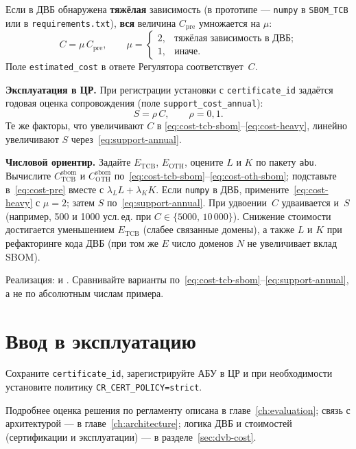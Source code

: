 Если в ДВБ обнаружена \textbf{тяжёлая} зависимость (в прототипе --- \texttt{numpy} в \texttt{SBOM\_TCB} или в \texttt{requirements.txt}), \textbf{вся} величина $C_{\mathrm{pre}}$ умножается на $\mu$:
\begin{equation}
\label{eq:cost-heavy}
  C = \mu\, C_{\mathrm{pre}}, \qquad
  \mu =
  \begin{cases}
    2, & \text{тяжёлая зависимость в ДВБ;} \\
    1, & \text{иначе.}
  \end{cases}
\end{equation}
Поле \texttt{estimated\_cost} в ответе Регулятора соответствует~$C$.

\textbf{Эксплуатация в ЦР.} При регистрации установки с \texttt{certificate\_id} задаётся годовая оценка сопровождения (поле \texttt{support\_cost\_annual}):
\begin{equation}
\label{eq:support-annual}
  S = \rho\, C, \qquad \rho = 0{,}1.
\end{equation}
Те же факторы, что увеличивают $C$ в \eqref{eq:cost-tcb-sbom}--\eqref{eq:cost-heavy}, линейно увеличивают $S$ через~\eqref{eq:support-annual}.

\textbf{Числовой ориентир.} Задайте $E_{\mathrm{TCB}}$, $E_{\mathrm{OTH}}$, оцените $L$ и $K$ по пакету \texttt{abu}. Вычислите $C_{\mathrm{TCB}}^{\mathrm{sbom}}$ и $C_{\mathrm{OTH}}^{\mathrm{sbom}}$ по~\eqref{eq:cost-tcb-sbom}--\eqref{eq:cost-oth-sbom}; подставьте в~\eqref{eq:cost-pre} вместе с $\lambda_L L + \lambda_K K$. Если \texttt{numpy} в ДВБ, примените~\eqref{eq:cost-heavy} с $\mu=2$; затем $S$ по~\eqref{eq:support-annual}. При удвоении~$C$ удваивается и~$S$ (например, 500 и 1000 усл.\,ед. при $C\in\{5000,\,10\,000\}$). Снижение стоимости достигается уменьшением $E_{\mathrm{TCB}}$ (слабее связанные домены), а также $L$ и $K$ при рефакторинге кода ДВБ (при том же $E$ число доменов $N$ не увеличивает вклад SBOM).

Реализация:  и . Сравнивайте варианты по~\eqref{eq:cost-tcb-sbom}--\eqref{eq:support-annual}, а не по абсолютным числам примера.

\section{Ввод в эксплуатацию}

Сохраните \texttt{certificate\_id}, зарегистрируйте АБУ в ЦР и при необходимости установите политику \texttt{CR\_CERT\_POLICY=strict}.

Подробнее оценка решения по регламенту описана в главе~\ref{ch:evaluation}; связь с архитектурой --- в главе~\ref{ch:architecture}; логика ДВБ и стоимостей (сертификации и эксплуатации) --- в разделе~\ref{sec:dvb-cost}.
